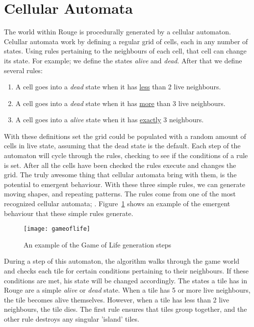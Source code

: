 \section{Cellular Automata}
The world within Rouge is procedurally generated by a cellular automaton. Celullar automata work by defining a regular grid of cells, each in any number of states. Using rules pertaining to the neighbours of each cell, that cell can change its state. For example; we define the states \textit{alive} and \textit{dead}. After that we define several rules:
\begin{enumerate}
	\item A cell goes into a \textit{dead} state when it has \underline{less} than 2 live neighbours.
	\item A cell goes into a \textit{dead} state when it has \underline{more} than 3 live neighbours.
	\item A cell goes into a \textit{alive} state when it has \underline{exactly} 3 neighbours.
\end{enumerate}
With these definitions set the grid could be populated with a random amount of cells in live state, assuming that the dead state is the default. Each step of the automaton will cycle through the rules, checking to see if the conditions of a rule is set. After all the cells have been checked the rules execute and changes the grid. The truly awesome thing that cellular automata bring with them, is the potential to emergent behaviour. With these three simple rules, we can generate moving shapes, and repeating patterns. The rules come from one of the most recognized cellular automata; . Figure~\ref{fig:game_of_life} shows an example of the emergent behaviour that these simple rules generate. 

\begin{figure}[p]
\texttt{[image: gameoflife]}
\caption{An example of the Game of Life generation steps}\label{fig:game_of_life}
\end{figure}

During a step of this automaton, the algorithm walks through the game world and checks each tile for certain conditions pertaining to their neighbours. If these conditions are met, his state will be changed accordingly. The states a tile has in Rouge are a simple \textit{alive} or \textit{dead} state. When a tile has 5 or more live neighbours, the tile becomes alive themselves. However, when a tile has less than 2 live neighbours, the tile dies. The first rule ensures that tiles group together, and the other rule destroys any singular 'island' tiles.

